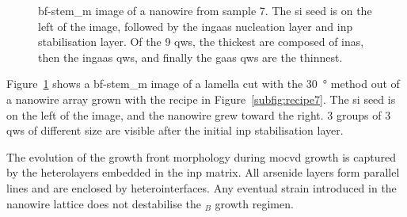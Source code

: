\begin{figure}
    \centering
    \caption[\acs{bf}-\acs{stem_m} image of a nanowire from sample 7.]{\acs{bf}-\acs{stem_m} image of a nanowire from sample 7. The \acs{si} seed is on the left of the image, followed by the \acs{ingaas} nucleation layer and \acs{inp} stabilisation layer. Of the \num{9} \acl{qw}s, the thickest are composed of \acs{inas}, then the \acs{ingaas} \acl{qw}s, and finally the \acs{gaas} \acl{qw}s are the thinnest.}
    \label{fig:s7_OV}
\end{figure}

Figure~\ref{fig:s7_OV} shows a \acs{bf}-\acs{stem_m} image of a lamella cut with the \qty{30}{\degree} method out of a nanowire array grown with the recipe in Figure~\ref{subfig:recipe7}. The \acl{si} seed is on the left of the image, and the nanowire grew toward the right. \num{3} groups of \num{3} \acl{qw}s of different size are visible after the  initial \acs{inp} stabilisation layer.

The evolution of the growth front morphology during \acs{mocvd} growth is captured by the heterolayers embedded in the \acs{inp} matrix. All arsenide layers form parallel lines and are enclosed by  heterointerfaces. Any eventual strain introduced in the nanowire lattice does not destabilise the \(_B\) growth regimen.

